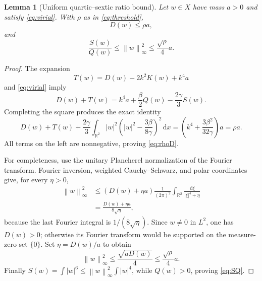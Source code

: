 \documentclass[11pt]{article}
\numberwithin{equation}{section}
\newtheorem{lemma}[theorem]{Lemma}
\theoremstyle{remark}
\newcommand{\R}{\mathbb{R}}
\newcommand{\dd}{\,\mathrm{d}}
\newcommand{\norm}[1]{\left\lVert #1\right\rVert}
\newcommand{\abs}[1]{\left\lvert #1\right\rvert}
\begin{document}
\begin{lemma}[Uniform quartic--sextic ratio bound]\label{lem:ratio}
Let $w\in X$ have mass $a>0$ and satisfy \eqref{eq:virial}.
With $\rho$ as in \eqref{eq:threshold},
\begin{equation}\label{eq:rhoD}
D(w)\le\rho a,
\end{equation}
and
\begin{equation}\label{eq:SQ}
\frac{S(w)}{Q(w)}\le\norm{w}_\infty^2
\le\frac{\sqrt\rho}{4}a.
\end{equation}
\end{lemma}
\begin{proof}
The expansion
\[
T(w)=D(w)-2k^2K(w)+k^4a
\]
and \eqref{eq:virial} imply
\[
D(w)+T(w)=k^4a+\frac{\beta}{2}Q(w)-\frac{2\gamma}{3}S(w).
\]
Completing the square produces the exact identity
\begin{equation}\label{eq:positiveidentity}
D(w)+T(w)+\frac{2\gamma}{3}
\int_{\R^2}\abs{w}^2
\left(\abs{w}^2-\frac{3\beta}{8\gamma}\right)^2\dd x
=\left(k^4+\frac{3\beta^2}{32\gamma}\right)a=\rho a.
\end{equation}
All terms on the left are nonnegative, proving \eqref{eq:rhoD}.

For completeness, use the unitary Plancherel normalization of the
Fourier transform.  Fourier inversion, weighted Cauchy--Schwarz,
and polar coordinates give, for every $\eta>0$,
\begin{align*}
\norm{w}_\infty^2
&\le (D(w)+\eta a)
\frac{1}{(2\pi)^2}\int_{\R^2}\frac{\dd\xi}{\abs\xi^4+\eta}\\
&=\frac{D(w)+\eta a}{8\sqrt\eta},
\end{align*}
because the last Fourier integral is $1/(8\sqrt\eta)$.
Since $w\ne0$ in $L^2$, one has $D(w)>0$; otherwise its Fourier transform
would be supported on the measure-zero set $\{0\}$.
Set $\eta=D(w)/a$ to obtain
\begin{equation}\label{eq:GNinfty}
\norm{w}_\infty^2\le\frac{\sqrt{aD(w)}}4
\le\frac{\sqrt\rho}{4}a.
\end{equation}
Finally $S(w)=\int\abs{w}^6\le\norm{w}_\infty^2\int\abs{w}^4$,
while $Q(w)>0$, proving \eqref{eq:SQ}.
\end{proof}
\end{document}
